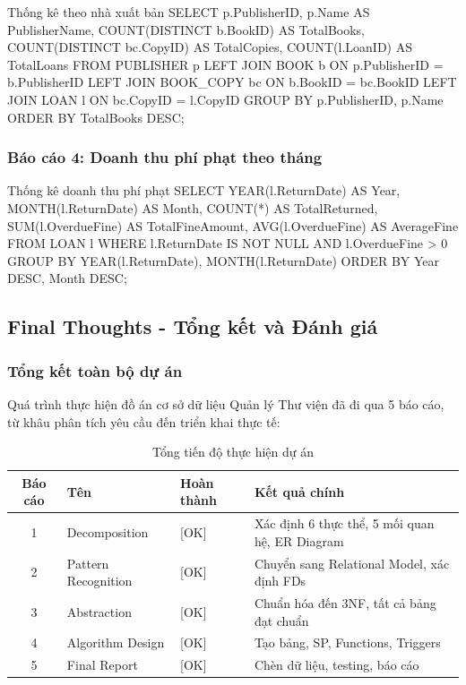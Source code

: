 \documentclass[12pt,a4paper]{article}
\begin{document}
\begin{sqlcode}{Thống kê theo nhà xuất bản}
SELECT
    p.PublisherID,
    p.Name AS PublisherName,
    COUNT(DISTINCT b.BookID) AS TotalBooks,
    COUNT(DISTINCT bc.CopyID) AS TotalCopies,
    COUNT(l.LoanID) AS TotalLoans
FROM PUBLISHER p
LEFT JOIN BOOK b ON p.PublisherID = b.PublisherID
LEFT JOIN BOOK_COPY bc ON b.BookID = bc.BookID
LEFT JOIN LOAN l ON bc.CopyID = l.CopyID
GROUP BY p.PublisherID, p.Name
ORDER BY TotalBooks DESC;
\end{sqlcode}

\subsubsection{Báo cáo 4: Doanh thu phí phạt theo tháng}

\begin{sqlcode}{Thống kê doanh thu phí phạt}
SELECT
    YEAR(l.ReturnDate) AS Year,
    MONTH(l.ReturnDate) AS Month,
    COUNT(*) AS TotalReturned,
    SUM(l.OverdueFine) AS TotalFineAmount,
    AVG(l.OverdueFine) AS AverageFine
FROM LOAN l
WHERE l.ReturnDate IS NOT NULL
  AND l.OverdueFine > 0
GROUP BY YEAR(l.ReturnDate), MONTH(l.ReturnDate)
ORDER BY Year DESC, Month DESC;
\end{sqlcode}

\subsection{Final Thoughts - Tổng kết và Đánh giá}

\subsubsection{Tổng kết toàn bộ dự án}

Quá trình thực hiện đồ án cơ sở dữ liệu Quản lý Thư viện đã đi qua 5 báo cáo, từ khâu phân tích yêu cầu đến triển khai thực tế:

\begin{table}[H]
\centering
\caption{Tổng tiến độ thực hiện dự án}
\begin{tabular}{|c|l|l|p{6cm}|}
\hline
\textbf{Báo cáo} & \textbf{Tên} & \textbf{Hoàn thành} & \textbf{Kết quả chính} \\ \hline
1 & Decomposition & [OK] & Xác định 6 thực thể, 5 mối quan hệ, ER Diagram \\ \hline
2 & Pattern Recognition & [OK] & Chuyển sang Relational Model, xác định FDs \\ \hline
3 & Abstraction & [OK] & Chuẩn hóa đến 3NF, tất cả bảng đạt chuẩn \\ \hline
4 & Algorithm Design & [OK] & Tạo bảng, SP, Functions, Triggers \\ \hline
5 & Final Report & [OK] & Chèn dữ liệu, testing, báo cáo \\ \hline
\end{tabular}
\end{table}
\end{document}
